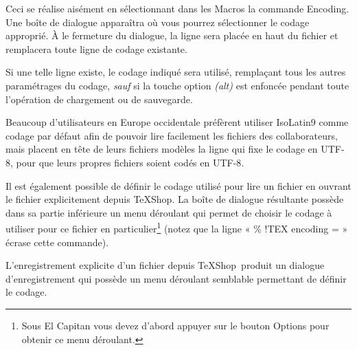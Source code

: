 \documentclass[11pt,french]{article}
\newcommand{\TS}{\textsf{\TeX Shop}}
\newcommand{\acr}[1]{\textsf{#1}}
\newcommand{\cmd}[1]{\textsf{#1}}
\begin{document}
Ceci se réalise aisément en sélectionnant dans les \cmd{Macros} la commande \cmd{Encoding}. Une boîte de dialogue apparaîtra où vous pourrez sélectionner le codage approprié. À le fermeture du dialogue, la ligne sera placée en haut du fichier et remplacera toute ligne de codage existante.

Si une telle ligne existe, le codage indiqué sera utilisé, remplaçant tous les autres paramétrages du codage, \emph{sauf} si la touche option \emph{(alt)} est enfoncée pendant toute l'opération de chargement ou de sauvegarde.

Beaucoup d'utilisateurs en Europe occidentale préfèrent utiliser \acr{IsoLatin9} comme codage par défaut afin de pouvoir lire facilement les fichiers des collaborateurs, mais placent en tête de leurs fichiers modèles la ligne qui fixe le codage en \acr{UTF-8}, pour que leurs propres fichiers soient codés en \acr{UTF-8}.

Il est également possible de définir le codage utilisé pour lire un fichier en ouvrant le fichier explicitement depuis \TS. La boîte de dialogue résultante possède dans sa partie inférieure un menu déroulant qui permet de choisir le codage à utiliser pour ce fichier en particulier\footnote{Sous \cmd{El Capitan} vous devez d'abord appuyer sur le bouton \cmd{Options} pour obtenir ce menu déroulant.} (notez que la ligne « \% !TEX encoding = » écrase cette commande).

L'enregistrement explicite d'un fichier depuis \TS\ produit un dialogue d'enregistrement qui possède un menu déroulant semblable permettant de définir le codage.
\end{document}
